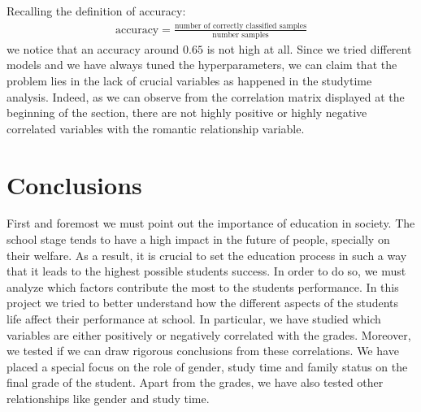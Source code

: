 \documentclass[a4paper, 11pt]{article}
\theoremstyle{definition}
\numberwithin{equation}{section}		%
\numberwithin{table}{section}				%
\begin{document}
Recalling the definition of accuracy:
\begin{align*}
    \text{accuracy} = \frac{\text{number of correctly classified samples}}{\text{number samples}}
\end{align*}
we notice that an accuracy around $0.65$ is not high at all. Since we tried different models and we have always tuned the hyperparameters, we can claim that the problem lies in the lack of crucial variables as happened in the studytime analysis. Indeed, as we can observe from the correlation matrix displayed at the beginning of the section, there are not highly positive or highly negative correlated variables with the romantic relationship variable.
\newpage
\section{Conclusions}
First and foremost we must point out the importance of education in society. The school stage tends to have a high impact in the future of people, specially on their welfare. As a result, it is crucial to set the education process in such a way that it leads to the highest possible students success. In order to do so, we must analyze which factors contribute the most to the students performance. In this project we tried to better understand how the different aspects of the students life affect their performance at school. In particular, we have studied which variables are either positively or negatively correlated with the grades. Moreover, we tested if we can draw rigorous conclusions from these correlations. We have placed a special focus on the role of gender, study time and family status on the final grade of the student. Apart from the grades, we have also tested other relationships like gender and study time.\bigskip
\end{document}
